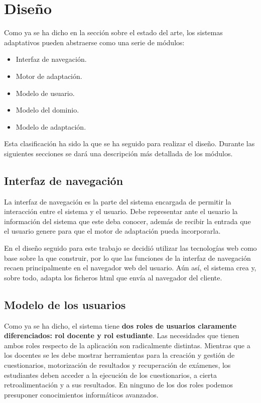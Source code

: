 
\section{Diseño}

Como ya se ha dicho en la sección sobre el estado del arte, los sistemas adaptativos pueden abstraerse como una serie de módulos:

\begin{itemize}
	\item Interfaz de navegación.
	\item Motor de adaptación.
	\item Modelo de usuario.
	\item Modelo del dominio.
	\item Modelo de adaptación.
\end{itemize} 

Esta clasificación ha sido la que se ha seguido para realizar el diseño. Durante las siguientes secciones se dará una descripción más detallada de los módulos.

\subsection{Interfaz de navegación}

La interfaz de navegación es la parte del sistema encargada de permitir la interacción entre el sistema y el usuario. Debe representar ante el usuario la información del sistema que este deba conocer, además de recibir la entrada que el usuario genere para que el motor de adaptación pueda incorporarla.

En el diseño seguido para este trabajo se decidió utilizar las tecnologías web como base sobre la que construir, por lo que las funciones de la interfaz de navegación recaen principalmente en el navegador web del usuario. Aún así, el sistema crea y, sobre todo, adapta los ficheros html que envía al navegador del cliente.

\subsection{Modelo de los usuarios}


Como ya se ha dicho, el sistema tiene \textbf{dos roles de usuarios claramente diferenciados: rol docente y rol estudiante}. Las necesidades que tienen ambos roles respecto de la aplicación son radicalmente distintas. Mientras que a los docentes se les debe mostrar herramientas para la creación y gestión de cuestionarios, motorización de resultados y recuperación de exámenes, los estudiantes deben acceder a la ejecución de los cuestionarios, a cierta retroalimentación y a sus resultados. En ninguno de los dos roles podemos presuponer conocimientos informáticos avanzados.%

